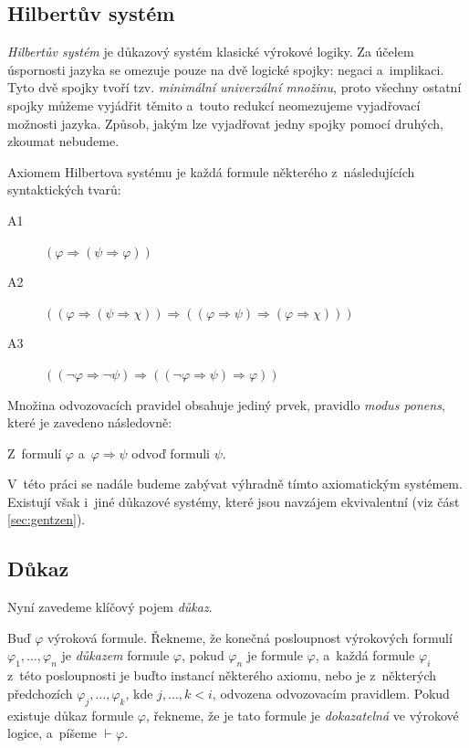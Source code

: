 \documentclass[thesis=B,czech,hidelinks]{thesis}[2012/06/26]
\begin{document}
\subsection{Hilbertův systém}
\label{sec:hilbert}

\emph{Hilbertův systém} je důkazový systém klasické výrokové logiky. Za účelem úspornosti jazyka se omezuje pouze na dvě logické spojky: negaci a~implikaci. Tyto dvě spojky tvoří tzv. \emph{minimální univerzální množinu}, proto všechny ostatní spojky můžeme vyjádřit těmito a~touto redukcí neomezujeme vyjadřovací možnosti jazyka\cite{stary}. Způsob, jakým lze vyjadřovat jedny spojky pomocí druhých, zkoumat nebudeme.

Axiomem Hilbertova systému je každá formule některého z~následujících syntaktických tvarů:

\begin{description}
	\item[A1] $( \varphi \Rightarrow ( \psi \Rightarrow \varphi ))$
	\item[A2] $(( \varphi \Rightarrow ( \psi \Rightarrow \chi )) \Rightarrow (( \varphi \Rightarrow \psi ) \Rightarrow ( \varphi \Rightarrow \chi )))$
	\item[A3] $(( \neg \varphi \Rightarrow \neg \psi ) \Rightarrow (( \neg \varphi \Rightarrow \psi ) \Rightarrow \varphi ))$
\end{description}

Množina odvozovacích pravidel obsahuje jediný prvek, pravidlo \emph{modus ponens}, které je zavedeno následovně:

\begin{dfn}
Z~formulí $\varphi$ a~$\varphi \Rightarrow \psi$ odvoď formuli $\psi$.
\end{dfn}

V~této práci se nadále budeme zabývat výhradně tímto axiomatickým systémem. Existují však i~jiné důkazové systémy, které jsou navzájem ekvivalentní\cite{stary} (viz část \ref{sec:gentzen}).

\subsection{Důkaz}

Nyní zavedeme klíčový pojem \emph{důkaz}\cite{stary}.

\begin{dfn}
Buď $\varphi$ výroková formule. Řekneme, že konečná posloupnost výrokových formulí $\varphi_1 , \ldots, \varphi_n$ je \emph{důkazem} formule $\varphi$, pokud $\varphi_n$ je formule $\varphi$, a~každá formule $\varphi_i$ z~této posloupnosti je buďto instancí některého axiomu, nebo je z~některých předchozích $\varphi_j, \ldots , \varphi_k$, kde $j, \ldots , k < i$, odvozena odvozovacím pravidlem. Pokud existuje důkaz formule $\varphi$, řekneme, že je tato formule je \emph{dokazatelná} ve výrokové logice, a~píšeme $\vdash \varphi$.
\end{dfn}
\end{document}
